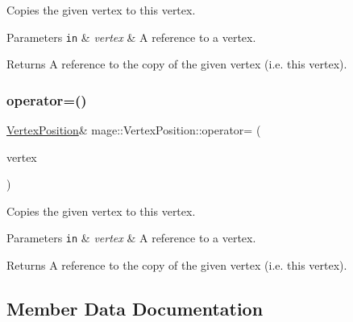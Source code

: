 Copies the given vertex to this vertex.


\begin{DoxyParams}[1]{Parameters}
\mbox{\tt in}  & {\em vertex} & A reference to a vertex. \\
\hline
\end{DoxyParams}
\begin{DoxyReturn}{Returns}
A reference to the copy of the given vertex (i.\+e. this vertex). 
\end{DoxyReturn}
\hypertarget{structmage_1_1_vertex_position_a37000c522dc4d0078ac879dc46532911}{}\label{structmage_1_1_vertex_position_a37000c522dc4d0078ac879dc46532911} 
\subsubsection{\texorpdfstring{operator=()}{operator=()}\hspace{0.1cm}{\footnotesize\ttfamily [2/2]}}
{\footnotesize\ttfamily \hyperlink{structmage_1_1_vertex_position}{Vertex\+Position}\& mage\+::\+Vertex\+Position\+::operator= (\begin{DoxyParamCaption}\item[{\hyperlink{structmage_1_1_vertex_position}{Vertex\+Position} \&\&}]{vertex }\end{DoxyParamCaption})\hspace{0.3cm}{\ttfamily [default]}}

Copies the given vertex to this vertex.


\begin{DoxyParams}[1]{Parameters}
\mbox{\tt in}  & {\em vertex} & A reference to a vertex. \\
\hline
\end{DoxyParams}
\begin{DoxyReturn}{Returns}
A reference to the copy of the given vertex (i.\+e. this vertex). 
\end{DoxyReturn}


\subsection{Member Data Documentation}
\hypertarget{structmage_1_1_vertex_position_a1128c6529b1c1d7c4482e48deba46548}{}\label{structmage_1_1_vertex_position_a1128c6529b1c1d7c4482e48deba46548} 
